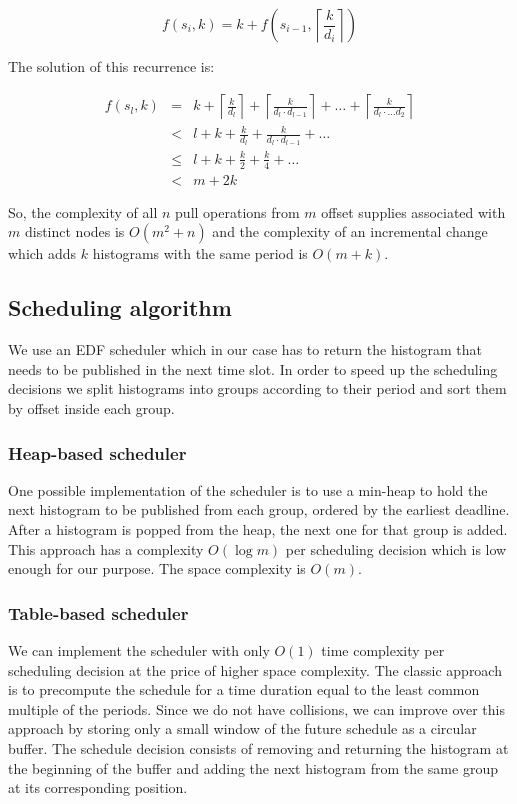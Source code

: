 $$ f(s_i, k) = k + f\left(s_{i-1}, \left\lceil \frac k {d_i} \right\rceil \right)$$

The solution of this recurrence is:

\begin{eqnarray*}
f(s_l,k) &=& k+ \left\lceil \frac k {d_l} \right\rceil + \left\lceil \frac k {d_l\cdot d_{l-1}} \right\rceil + \ldots + \left\lceil \frac k {d_l\cdot \ldots d_2}\right\rceil \\
         &<&l+k+\frac k {d_l}+ \frac k {d_l\cdot d_{l-1}} + \ldots \\
         &\leq & l+k+\frac k 2+\frac k 4 + \ldots \\
         &<& m+2k
\end{eqnarray*}

So, the complexity of all $n$ pull operations from $m$ offset supplies associated with $m$ distinct nodes is $O(m^2+n)$ and the complexity of an incremental change which adds $k$ histograms with the same period is $O(m+k)$. 

\subsection*{Scheduling algorithm}

We use an EDF scheduler which in our case has to return the histogram that needs to be published in the next time slot. In order to speed up the scheduling decisions we split histograms into groups according to their period and sort them by offset inside each group. 

\subsubsection*{Heap-based scheduler}

One possible implementation of the scheduler is to use a min-heap to hold the next histogram to be published from each group, ordered by the earliest deadline. After a histogram is popped from the heap, the next one for that group is added. This approach has a complexity $O(\log m)$ per scheduling decision which is low enough for our purpose. The space complexity is $O(m)$.

\subsubsection*{Table-based scheduler}

We can implement the scheduler with only $O(1)$ time complexity per scheduling decision at the price of higher space complexity. The classic approach is to precompute the schedule for a time duration equal to the least common multiple of the periods. Since we do not have collisions, we can improve over this approach by storing only a small window of the future schedule as a circular buffer. The schedule decision consists of removing and returning the histogram at the beginning of the buffer and adding the next histogram from the same group at its corresponding position.
 
